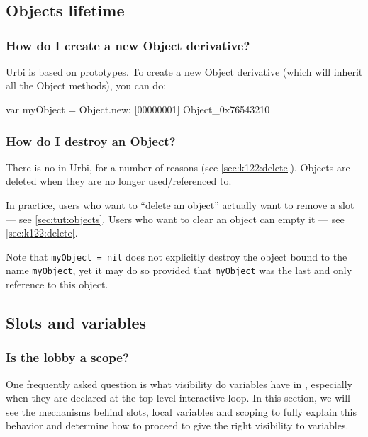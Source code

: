 \section{\us}
\subsection{Objects lifetime}

\subsubsection{How do I create a new Object derivative?}
Urbi is based on prototypes. To create a new Object derivative (which
will inherit all the Object methods), you can do:

\begin{urbiscript}
var myObject = Object.new;
[00000001] Object_0x76543210
\end{urbiscript}

\subsubsection{How do I destroy an Object?}
There is no  in Urbi, for a number of reasons (see
\autoref{sec:k122:delete}).  Objects are deleted when they are no
longer used/referenced to.

In practice, users who want to ``delete an object'' actually want to
remove a slot --- see \autoref{sec:tut:objects}.  Users who want to
clear an object can empty it --- see \autoref{sec:k122:delete}.

Note that \lstinline{myObject = nil} does not explicitly destroy the
object bound to the name \lstinline{myObject}, yet it may do
so provided that \lstinline{myObject} was the last and only reference
to this object.

\subsection{Slots and variables}

\subsubsection{Is the lobby a scope?}

One frequently asked question is what visibility do variables have in
\us, especially when they are declared at the top-level interactive
loop.  In this section, we will see the mechanisms behind slots, local
variables and scoping to fully explain this behavior and determine how
to proceed to give the right visibility to variables.

